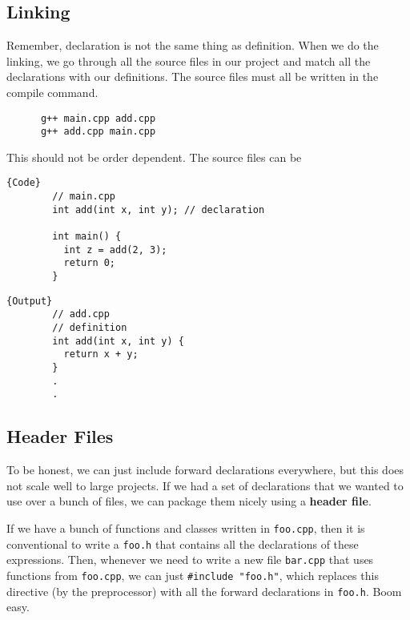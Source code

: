 \documentclass{article}
\begin{document}
  \subsection{Linking} 

    Remember, declaration is not the same thing as definition. When we do the linking, we go through all the source files in our project and match all the declarations with our definitions. The source files must all be written in the compile command. 

    \begin{lstlisting}
      g++ main.cpp add.cpp
      g++ add.cpp main.cpp
    \end{lstlisting}

    This should not be order dependent. The source files can be 

    \noindent\begin{minipage}{.5\textwidth}
      \begin{lstlisting}[]{Code}
        // main.cpp 
        int add(int x, int y); // declaration

        int main() {  
          int z = add(2, 3); 
          return 0; 
        }
      \end{lstlisting}
      \end{minipage}
      \hfill
      \begin{minipage}{.49\textwidth}
      \begin{lstlisting}[]{Output}
        // add.cpp
        // definition
        int add(int x, int y) { 
          return x + y;
        }
        .
        .
      \end{lstlisting}
    \end{minipage}

  \subsection{Header Files} 

    To be honest, we can just include forward declarations everywhere, but this does not scale well to large projects. If we had a set of declarations that we wanted to use over a bunch of files, we can package them nicely using a \textbf{header file}. 
    
    If we have a bunch of functions and classes written in \texttt{foo.cpp}, then it is conventional to write a \texttt{foo.h} that contains all the declarations of these expressions. Then, whenever we need to write a new file \texttt{bar.cpp} that uses functions from \texttt{foo.cpp}, we can just \texttt{\#include "foo.h"}, which replaces this directive (by the preprocessor) with all the forward declarations in \texttt{foo.h}. Boom easy. 
\end{document}

